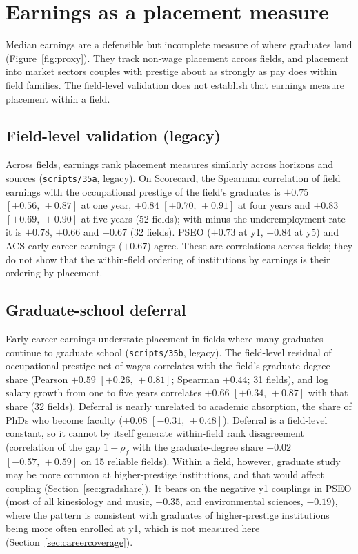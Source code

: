\documentclass[11pt]{article}
\newcommand{\ci}[2]{$[#1,\allowbreak\,#2]$}
\newcommand{\scr}[1]{\texttt{scripts/#1}}
\begin{document}
\section{Earnings as a placement measure}\label{sec:placement}

Median earnings are a defensible but incomplete measure of where graduates land (Figure~\ref{fig:proxy}). They track non-wage placement across fields, and
placement into market sectors couples with prestige about as strongly as pay does within field families. The field-level
validation does not establish that earnings measure placement within a field.

\subsection{Field-level validation (legacy)}\label{sec:proxy}

Across fields, earnings rank placement measures similarly across horizons and sources (\scr{35a}, legacy). On Scorecard, the Spearman
correlation of field earnings with the occupational prestige of the field's graduates is $+0.75$ \ci{+0.56}{+0.87} at one year, $+0.84$
\ci{+0.70}{+0.91} at four years and $+0.83$ \ci{+0.69}{+0.90} at five years (52 fields); with minus the underemployment rate it is $+0.78$, $+0.66$ and
$+0.67$ (32 fields). PSEO ($+0.73$ at y1, $+0.84$ at y5) and ACS early-career earnings ($+0.67$) agree. These are correlations across fields;
they do not show that the within-field ordering of institutions by earnings is their ordering by placement.

\subsection{Graduate-school deferral}\label{sec:deferral}

Early-career earnings understate placement in fields where many graduates continue to graduate school (\scr{35b}, legacy). The field-level
residual of occupational prestige net of wages correlates with the field's graduate-degree share (Pearson $+0.59$ \ci{+0.26}{+0.81}; Spearman
$+0.44$; 31 fields), and log salary growth from one to five years correlates $+0.66$ \ci{+0.34}{+0.87} with that share (32 fields). Deferral is
nearly unrelated to academic absorption, the share of PhDs who become faculty ($+0.08$ \ci{-0.31}{+0.48}). Deferral is a field-level constant,
so it cannot by itself generate within-field rank disagreement (correlation of the gap $1-\rho_f$ with the graduate-degree share
$+0.02$ \ci{-0.57}{+0.59} on 15 reliable fields). Within a field, however, graduate study may be more common at
higher-prestige institutions, and that would affect coupling (Section~\ref{sec:gradshare}). It bears on the negative y1
couplings in PSEO (most of all kinesiology and music, $-0.35$, and environmental sciences, $-0.19$), where the pattern is
consistent with graduates of higher-prestige institutions being more often enrolled at y1, which is not measured here
(Section~\ref{sec:careercoverage}).
\end{document}
